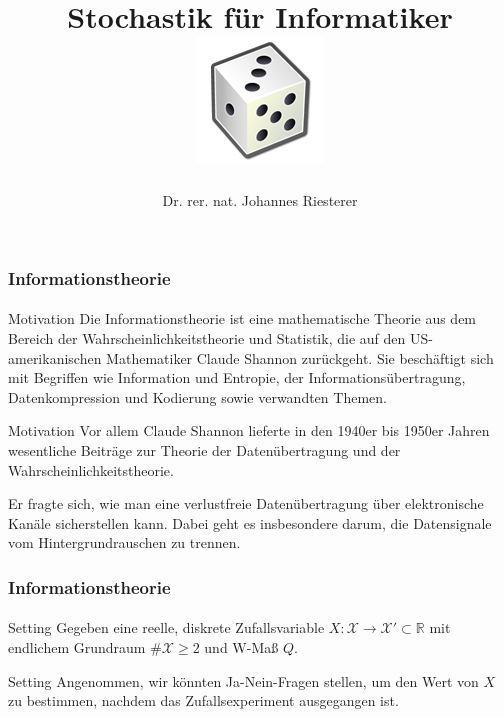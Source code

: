 \documentclass{beamer}
\begin{document}
\title[Stochastik] %
{Stochastik für Informatiker
\\
\includegraphics[scale=0.5]{img/craps}
}
\subtitle{}
\author[Dr. Johannes Riesterer] %
{Dr.  rer. nat. Johannes Riesterer}

\date[KPT 2004] %
{}

\subject{Stochastik}


\frame{\titlepage}
\begin{frame}
    \frametitle{Informationstheorie}
\framesubtitle{}
\begin{block}{Motivation}
Die Informationstheorie ist eine mathematische Theorie aus dem Bereich der Wahrscheinlichkeitstheorie und Statistik, die auf den US-amerikanischen Mathematiker Claude Shannon zurückgeht. Sie beschäftigt sich mit Begriffen wie Information und Entropie, der Informationsübertragung, Datenkompression und Kodierung sowie verwandten Themen. 
\end{block}


\begin{block}{Motivation}
Vor allem Claude Shannon lieferte in den 1940er bis 1950er Jahren wesentliche Beiträge zur Theorie der Datenübertragung und der Wahrscheinlichkeitstheorie.

Er fragte sich, wie man eine verlustfreie Datenübertragung über elektronische Kanäle sicherstellen kann. Dabei geht es insbesondere darum, die Datensignale vom Hintergrundrauschen zu trennen. 
\end{block}

 \end{frame}




\begin{frame}
    \frametitle{Informationstheorie}
\framesubtitle{}
\begin{block}{Setting}
Gegeben eine reelle, diskrete Zufallsvariable $X :\mathcal{X} \to \mathcal{X}'  \subset  \mathbb{R}$ mit endlichem Grundraum $\#\mathcal{X}  \geq 2$ und W-Maß $Q$.
\end{block}

\begin{block}{Setting}
Angenommen, wir könnten Ja-Nein-Fragen stellen, um den Wert von $X$ zu bestimmen, nachdem das Zufallsexperiment ausgegangen ist.

\end{block}

 \end{frame}
\end{document}
